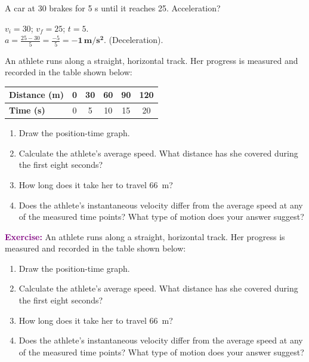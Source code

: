 \begin{exercise}
    A car at \qty{30}{\mps} brakes for 5 s until it reaches \qty{25}{\mps}. Acceleration?
    \begin{solu}
        $v_i = 30$; $v_f = 25$; $t = 5$. \\
        $a = \frac{25 - 30}{5} = \frac{-5}{5} = \mathbf{-1\,m/s^2}$. (Deceleration).
    \end{solu}
\end{exercise}


\begin{exercise}
    An athlete runs along a straight, horizontal track. Her progress is measured and recorded in the table shown below:
    \begin{table}[H]
        \centering
        \renewcommand{\arraystretch}{1.5}
        \begin{tabular}{Occccc}
            \bottomrule
            \textcolor{ocre}{\textbf{Distance (\unit{\metre})}} & 0 & 30 & 60 & 90 & 120 \\
            \hline
            \textcolor{ocre}{\textbf{Time (\unit{\s})}}         & 0 & 5  & 10 & 15 & 20  \\
            \toprule
        \end{tabular}
        \label{tab:ejercicio2}
    \end{table}

    \begin{enumerate}[label=\letraminuscula]
    \item Draw the position-time graph.
    \item Calculate the athlete's average speed. What distance has she covered during the first eight seconds?
    \item How long does it take her to travel \qty{66}{\m}?
    \item Does the athlete's instantaneous velocity differ from the average speed at any of the measured time points? What type of motion does your answer suggest?
    \end{enumerate}

    \begin{solu}
        \textbf{\textcolor{purple}{Exercise:}} An athlete runs along a straight, horizontal track. Her progress is measured and recorded in the table shown below:
        \begin{enumerate}[label=\letraminuscula]
            \item Draw the position-time graph.
            \item Calculate the athlete's average speed. What distance has she covered during the first eight seconds?
            \item How long does it take her to travel \qty{66}{\m}?
            \item Does the athlete's instantaneous velocity differ from the average speed at any of the measured time points? What type of motion does your answer suggest?
        \end{enumerate}


\end{solu}
\end{exercise}
